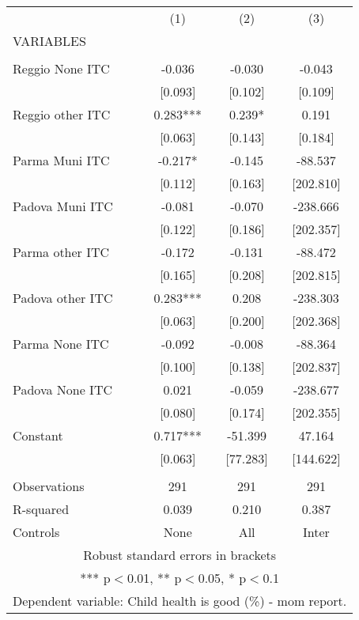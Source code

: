 \begin{tabular}{lccc} \hline
 & (1) & (2) & (3) \\
VARIABLES &  &  &  \\ \hline
 &  &  &  \\
Reggio None ITC & -0.036 & -0.030 & -0.043 \\
 & [0.093] & [0.102] & [0.109] \\
Reggio other ITC & 0.283*** & 0.239* & 0.191 \\
 & [0.063] & [0.143] & [0.184] \\
Parma Muni ITC & -0.217* & -0.145 & -88.537 \\
 & [0.112] & [0.163] & [202.810] \\
Padova Muni ITC & -0.081 & -0.070 & -238.666 \\
 & [0.122] & [0.186] & [202.357] \\
Parma other ITC & -0.172 & -0.131 & -88.472 \\
 & [0.165] & [0.208] & [202.815] \\
Padova other ITC & 0.283*** & 0.208 & -238.303 \\
 & [0.063] & [0.200] & [202.368] \\
Parma None ITC & -0.092 & -0.008 & -88.364 \\
 & [0.100] & [0.138] & [202.837] \\
Padova None ITC & 0.021 & -0.059 & -238.677 \\
 & [0.080] & [0.174] & [202.355] \\
Constant & 0.717*** & -51.399 & 47.164 \\
 & [0.063] & [77.283] & [144.622] \\
 &  &  &  \\
Observations & 291 & 291 & 291 \\
R-squared & 0.039 & 0.210 & 0.387 \\
 Controls & None & All & Inter \\ \hline
\multicolumn{4}{c}{ Robust standard errors in brackets} \\
\multicolumn{4}{c}{ *** p$<$0.01, ** p$<$0.05, * p$<$0.1} \\
\multicolumn{4}{c}{ Dependent variable: Child health is good (\%) - mom report.} \\
\end{tabular}
